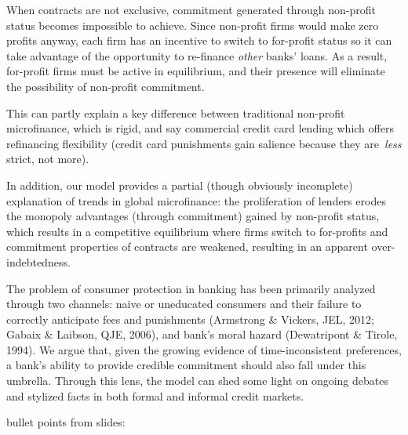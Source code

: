 \documentclass[11pt]{article}%
\begin{document}
When contracts are not exclusive, commitment generated through non-profit
status becomes impossible to achieve. Since non-profit firms would make zero
profits anyway, each firm has an incentive to switch to for-profit status so
it can take advantage of the opportunity to re-finance \textit{other} banks'
loans. As a result, for-profit firms must be active in equilibrium, and their
presence will eliminate the possibility of non-profit commitment.

This can partly explain a key difference between traditional non-profit
microfinance, which is rigid, and say commercial credit card lending which
offers refinancing flexibility (credit card punishments gain salience because
they are\textit{\ less} strict, not more).

In addition, our model provides a partial (though obviously incomplete)
explanation of trends in global microfinance: the proliferation of lenders
erodes the monopoly advantages (through commitment) gained by non-profit
status, which results in a competitive equilibrium where firms switch to
for-profits and commitment properties of contracts are weakened, resulting in
an apparent over-indebtedness.

The problem of consumer protection in banking has been primarily analyzed
through two channels: naive or uneducated consumers and their failure to
correctly anticipate fees and punishments (Armstrong \& Vickers, JEL, 2012;
Gabaix \& Laibson, QJE, 2006), and bank's moral hazard (Dewatripont \& Tirole,
1994). We argue that, given the growing evidence of time-inconsistent
preferences, a bank's ability to provide credible commitment should also fall
under this umbrella. Through this lens, the model can shed some light on
ongoing debates and stylized facts in both formal and informal credit markets.

\bigskip

bullet points from slides:
\end{document}
